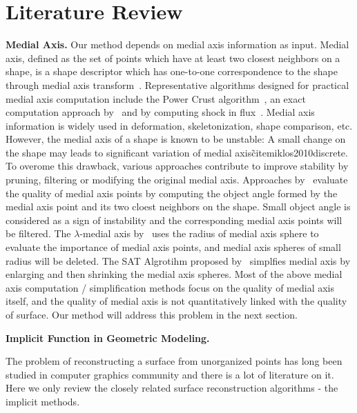\documentclass[review]{acmsiggraph}
\begin{document}
\section{Literature Review}



\textbf{Medial Axis. }
Our method depends on medial axis information as input. Medial axis, defined as the set of points which have at least two closest neighbors on a shape, is a shape descriptor which has one-to-one correspondence to the shape through medial axis transform~\cite{blum1967transformation}. Representative algorithms designed for practical medial axis computation include the Power Crust algorithm~\cite{amenta2000accurate,amenta2001medial}, an exact computation approach by~\cite{culver2004exact} and by computing shock in flux~\cite{siddiqi2002hamilton}. Medial axis information is widely used in deformation, skeletonization, shape comparison, etc. However, the medial axis of a shape is known to be unstable: A small change on the shape may leads to significant variation of medial axis\~cite{miklos2010discrete}. To overome this drawback, various approaches contribute to improve stability by pruning, filtering or modifying the original medial axis. Approaches by~\cite{amenta2001medial,foskey2003efficient,sud2005homotopy} evaluate the quality of medial axis points by computing the object angle formed by the medial axis point and its two cloest neighbors on the shape. Small object angle is considered as a sign of instability and the corresponding medial axis points will be filtered. The $\lambda$-medial axis by~\cite{chazal2005lambda,chaussard2009discrete} uses the radius of medial axis sphere to evaluate the importance of medial axis points, and medial axis spheres of small radius will be deleted. The SAT Algrotihm proposed by~\cite{miklos2010discrete} simplfies medial axis by enlarging and then shrinking the medial axis spheres. Most of the above medial axis computation / simplification methods focus on the quality of medial axis itself, and the quality of medial axis is not quantitatively linked with the quality of surface. Our method will address this problem in the next section.

\textbf{Implicit Function in Geometric Modeling. }

The problem of reconstructing a surface from unorganized points has long been studied in
computer graphics community and there is a lot of literature on it. Here we only review 
the closely related surface reconstruction algorithms - the implicit methods. 
\end{document}
